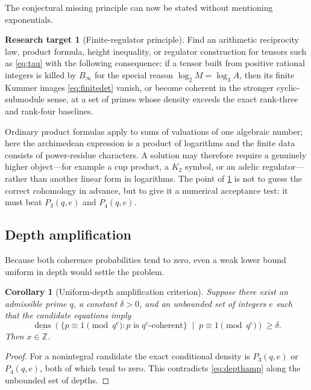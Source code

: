 \documentclass[11pt]{article}
\newtheorem{corollary}[theorem]{Corollary}
\theoremstyle{definition}
\newtheorem{problem}[theorem]{Research target}
\theoremstyle{remark}
\newcommand{\Z}{\mathbb{Z}}
\newcommand{\dens}{\operatorname{dens}}
\begin{document}
The conjectural missing principle can now be stated without mentioning exponentials.

\begin{problem}[Finite-regulator principle]\label{prob:regulator}
Find an arithmetic reciprocity law, product formula, height inequality, or regulator construction
for tensors such as \eqref{eq:tau} with the following consequence: if a tensor built from positive
rational integers is killed by $B_\infty$ for the special reason
$\log_2 M=\log_3 A$, then its finite Kummer images
\eqref{eq:finitedet} vanish, or become coherent in the stronger cyclic-submodule sense, at a
set of primes whose density exceeds the exact rank-three and rank-four baselines.
\end{problem}

Ordinary product formulas apply to sums of valuations of one algebraic number; here the
archimedean expression is a product of logarithms and the finite data consists of power-residue
characters.  A solution may therefore require a genuinely higher object---for example a cup
product, a $K_2$ symbol, or an adelic regulator---rather than another linear form in logarithms.
The point of \cref{prob:regulator} is not to guess the correct cohomology in advance, but to give
it a numerical acceptance test: it must beat $P_3(q,e)$ and $P_4(q,e)$.

\subsection{Depth amplification}

Because both coherence probabilities tend to zero, even a weak lower bound uniform in depth
would settle the problem.

\begin{corollary}[Uniform-depth amplification criterion]\label{cor:depthamp}
Suppose there exist an admissible prime $q$, a constant $\delta>0$, and an unbounded set of
integers $e$ such that the candidate equations imply
\[
 \underline{\dens}\left(
   \{p\equiv1\pmod{q^e}:p\text{ is }q^e\text{-coherent}\}
   \;\middle|\;p\equiv1\pmod{q^e}
 \right)\ge\delta.
 \tag{10.4}\label{eq:depthamp}
\]
Then $x\in\Z$.
\end{corollary}
\begin{proof}
For a nonintegral candidate the exact conditional density is $P_3(q,e)$ or $P_4(q,e)$, both of
which tend to zero.  This contradicts \eqref{eq:depthamp} along the unbounded set of depths.
\end{proof}
\end{document}
